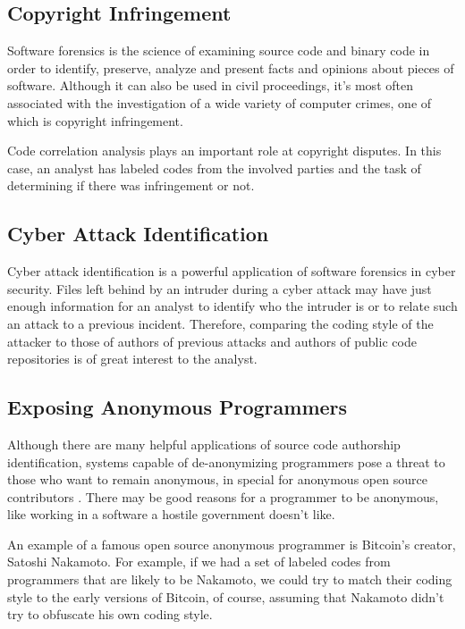 \subsection{Copyright Infringement}

Software forensics is the science of examining source code and binary code in order to identify, preserve, analyze and present facts and opinions about pieces of software. Although it can also be used in civil proceedings, it's most often associated with the investigation of a wide variety of computer crimes, one of which is copyright infringement.

Code correlation analysis plays an important role at copyright disputes. In this case, an analyst has labeled codes from the involved parties and the task of determining if there was infringement or not.

\subsection{Cyber Attack Identification}

Cyber attack identification is a powerful application of software forensics in cyber security. Files left behind by an intruder during a cyber attack may have just enough information for an analyst to identify who the intruder is or to relate such an attack to a previous incident. Therefore, comparing the coding style of the attacker to those of authors of previous attacks and authors of public code repositories is of great interest to the analyst.


\subsection{Exposing Anonymous Programmers}

Although there are many helpful applications of source code authorship identification, systems capable of de-anonymizing programmers pose a threat to those who want to remain anonymous, in special for anonymous open source contributors \cite{gitblame}. There may be good reasons for a programmer to be anonymous, like working in a software a hostile government doesn't like. 

An example of a famous open source anonymous programmer is Bitcoin's creator, Satoshi Nakamoto. For example, if we had a set of labeled codes from programmers that are likely to be Nakamoto, we could try to match their coding style to the early versions of Bitcoin, of course, assuming that Nakamoto didn't try to obfuscate his own coding style.

